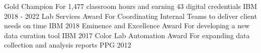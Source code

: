 \begin{cvhonors}
  \cvhonor
    {Gold Champion} %
    {For 1,477 classroom hours and earning 43 digital credentials} %
    {IBM} %
    {2018 - 2022} %
  \cvhonor
    {Lab Services Award} %
    {For Coordinating Internal Teams to deliver client needs on time} %
    {IBM} %
    {2018} %
  \cvhonor
    {Eminence and Excellence Award} %
    {For developing a new data curation tool} %
    {IBM} %
    {2017} %
  \cvhonor
    {Color Lab Automation Award} %
    {For expanding data collection and analysis reports}
    {PPG} %
    {2012} %
\end{cvhonors}
